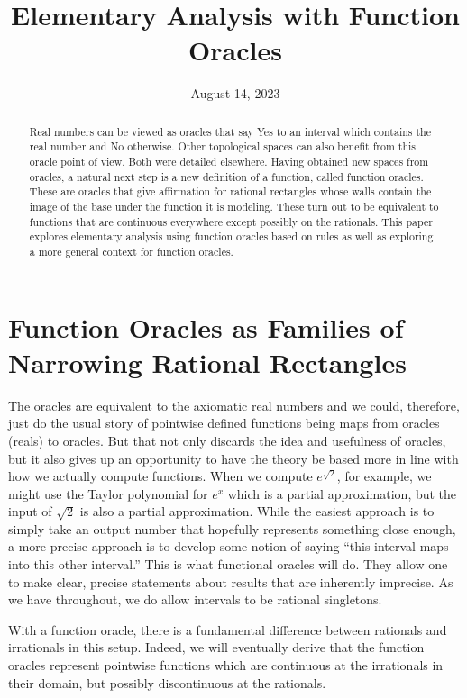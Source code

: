 \documentclass[12pt]{article}
\title{Elementary Analysis with Function Oracles}
\date{August 14, 2023}
\begin{document}
\maketitle
\begin{abstract}
Real numbers can be viewed as oracles that say Yes to an interval which contains the real number and No otherwise. Other topological spaces can also benefit from this oracle point of view.  Both were detailed elsewhere. Having obtained new spaces from oracles, a natural next step is a new definition of a function, called function oracles. These are oracles that give affirmation for rational rectangles whose walls contain the image of the base under the function it is modeling. These turn out to be equivalent to functions that are continuous everywhere except possibly on the rationals. This paper explores elementary analysis using function oracles based on rules as well as exploring a more general context for function oracles. 
\end{abstract}

\tableofcontents


\section{Function Oracles as Families of Narrowing Rational Rectangles}\label{sec:funora}

The oracles are equivalent to the axiomatic real numbers and we could, therefore, just do the usual story of pointwise defined functions being maps from oracles (reals) to oracles. But that not only discards the idea and usefulness of oracles, but it also gives up an opportunity to have the theory be based more in line with how we actually compute functions. When we compute $e^{\sqrt{2}}$, for example, we might use the Taylor polynomial for $e^x$ which is a partial approximation, but the input of $\sqrt{2}$ is also a partial approximation. While the easiest approach is to simply take an output number that hopefully represents something close enough, a more precise approach is to develop some notion of saying ``this interval maps into this other interval.'' This is what functional oracles will do. They allow one to make clear, precise statements about results that are inherently imprecise. As we have throughout, we do allow intervals to be rational singletons. 

With a function oracle, there is a fundamental difference between rationals and irrationals in this setup. Indeed, we will eventually derive that the function oracles represent pointwise functions which are continuous at the irrationals in their domain, but possibly discontinuous at the rationals.
\end{document}
